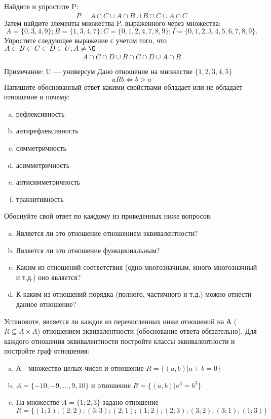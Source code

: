 \documentclass[10pt]{exam}
\begin{document}
\begin{questions}
\question
Найдите и упростите P:
\begin{equation*}
\overline{P} = A \cap \overline{C} \cup A \cap \overline{B} \cup B \cap \overline{C} \cup A \cap C
\end{equation*}
Затем найдите элементы множества P, выраженного через множества:
\begin{equation*}
A = \{0, 3, 4, 9\}; 
B = \{1, 3, 4, 7\};
C = \{0, 1, 2, 4, 7, 8, 9\};
I = \{0, 1, 2, 3, 4, 5, 6, 7, 8, 9\}.
\end{equation*}\question
Упростите следующее выражение с учетом того, что $A\subset B \subset C \subset D \subset U; A \neq \O$
\begin{equation*}
\overline{A} \cap \overline{C} \cap D \cup \overline{B} \cap \overline{C} \cap D \cup A \cap B
\end{equation*}

Примечание: U — универсум\question
Дано отношение на множестве $\{1, 2, 3, 4, 5\}$ 
\begin{equation*}
aRb \iff b > a
\end{equation*}
Напишите обоснованный ответ какими свойствами обладает или не обладает отношение и почему:   
\begin{enumerate} [a)]\setcounter{enumi}{0}
\item рефлексивность
\item антирефлексивность
\item симметричность
\item асимметричность
\item антисимметричность
\item транзитивность
\end{enumerate}

Обоснуйте свой ответ по каждому из приведенных ниже вопросов:
\begin{enumerate} [a)]\setcounter{enumi}{0}
    \item Является ли это отношение отношением эквивалентности?
    \item Является ли это отношение функциональным?
    \item Каким из отношений соответствия (одно-многозначным, много-многозначный и т.д.) оно является?
    \item К каким из отношений порядка (полного, частичного и т.д.) можно отнести данное отношение?
\end{enumerate}

\question
Установите, является ли каждое из перечисленных ниже отношений на А ($R \subseteq A \times A$) отношением эквивалентности (обоснование ответа обязательно). Для каждого отношения эквивалентности 
постройте классы эквивалентности и постройте граф отношения:
\begin{enumerate}[a)]\setcounter{enumi}{0}
\item А - множество целых чисел и отношение $R = \{(a,b)|a + b = 0\}$
\item $A = \{-10, -9, …, 9, 10\}$ и отношение $R = \{(a,b)|a^{3} = b^{3}\}$
\item На множестве $A = \{1; 2; 3\}$ задано отношение $R = \{(1; 1); (2; 2); (3; 3); (2; 1); (1; 2); (2; 3); (3; 2); (3; 1); (1; 3)\}$


\end{enumerate}
\end{questions}
\end{document}

